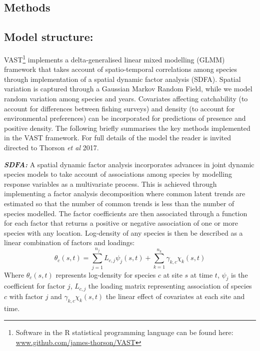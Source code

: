 \documentclass{nature}
\begin{document}
\begin{linenumbers}
\section*{Methods}

\subsection{Model structure:} 

VAST\footnote{Software in the R statistical programming language can be found
	here: \url{www.github.com/james-thorson/VAST}} implements a
delta-generalised linear mixed modelling (GLMM) framework that takes account of
spatio-temporal correlations among species through implementation of a
spatial dynamic factor analysis (SDFA). Spatial variation is captured through a
Gaussian Markov Random Field, while we model random variation among
species and years. Covariates affecting catchability (to account for
differences between fishing surveys) and density (to account for environmental
preferences) can be incorporated for predictions of presence and positive
density. The following briefly summarises the key methods implemented in the
VAST framework. For full details of the model the reader is invited directed to
Thorson \textit{et al} 2017\cite{Thorson2017}.

\textbf{\textit{SDFA:}} A spatial dynamic factor analysis incorporates advances
in joint dynamic species models\cite{Thorson2017} to take account of
associations among species by modelling response variables as a
multivariate process. This is achieved through implementing a factor analysis
decomposition where common latent trends are estimated so that the number of
common trends is less than the number of species modelled. The factor
coefficients are then associated through a function for each factor that
returns a positive or negative association of one or more species with any
location. Log-density of any species is then be described as a linear
combination of factors and loadings:
	\begin{equation}
		\theta_{c}(s,t) = \sum_{j=1}^{n_{j}}
		L_{c,j}\psi_{j}(s,t) +\sum_{k=1}^{n_{k}}
		\gamma_{k,c}\chi_{k}(s,t)
	\end{equation}
Where $\theta_{c}(s,t)$ represents log-density for species $c$ at site $s$ at
time $t$, $\psi_{j}$ is the coefficient for factor $j$, $L_{c,j}$ the loading
matrix representing association of species $c$ with factor $j$ and
$\gamma_{k,c}\chi_{k}(s,t)$ the linear effect of covariates at each site and
time\cite{Thorson2016b}. 


\end{linenumbers}
\end{document}
